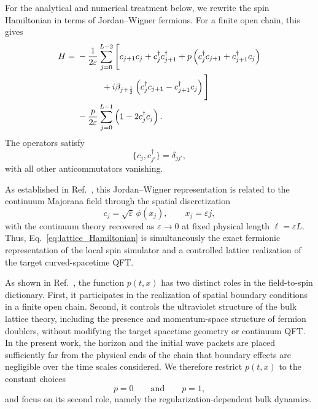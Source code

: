\documentclass[reprint,amsmath,amssymb,aps,prb,floatfix,showkeys,superscriptaddress]{revtex4-2}
\begin{document}
For the analytical and numerical treatment below, we rewrite the
spin Hamiltonian in terms of Jordan--Wigner fermions. For a finite
open chain, this gives
\begin{align}
  H
  ={}&
  -\frac{1}{2\varepsilon}
  \sum_{j=0}^{L-2}
  \Bigg[
    c_{j+1}c_j
    +
    c_j^\dagger c_{j+1}^\dagger
    +
    p\left(
      c_j^\dagger c_{j+1}
      +
      c_{j+1}^\dagger c_j
    \right)
  \nonumber\\
  &\hspace{10mm}
    +
    i\beta_{j+\frac12}
    \left(
      c_j^\dagger c_{j+1}
      -
      c_{j+1}^\dagger c_j
    \right)
  \Bigg]
  \nonumber\\
  &-
  \frac{p}{2\varepsilon}
  \sum_{j=0}^{L-1}
  \left(
    1-2c_j^\dagger c_j
  \right).
  \label{eq:lattice_Hamiltonian}
\end{align}
The operators satisfy
\begin{equation}
  \{c_j,c_{j'}^\dagger\}
  =
  \delta_{jj'},
  \label{eq:lattice_anticommutation}
\end{equation}
with all other anticommutators vanishing.

As established in Ref.~\cite{Kinoshita2025}, this Jordan--Wigner
representation is related to the continuum Majorana field through
the spatial discretization
\begin{equation}
  c_j
  =
  \sqrt{\varepsilon}\,
  \phi(x_j),
  \qquad
  x_j=\varepsilon j,
  \label{eq:continuum_identification}
\end{equation}
with the continuum theory recovered as
$\varepsilon\to0$ at fixed physical length
$\ell=\varepsilon L$. Thus,
Eq.~\eqref{eq:lattice_Hamiltonian} is simultaneously the exact
fermionic representation of the local spin simulator and a
controlled lattice realization of the target curved-spacetime QFT.

As shown in Ref.~\cite{KinoshitaBoundary2026}, the function
$p(t,x)$ has two distinct roles in the field-to-spin dictionary.
First, it participates in the realization of spatial boundary
conditions in a finite open chain. Second, it controls the
ultraviolet structure of the bulk lattice theory, including the
presence and momentum-space structure of fermion doublers, without
modifying the target spacetime geometry or continuum QFT. In the
present work, the horizon and the initial wave packets are placed
sufficiently far from the physical ends of the chain that boundary
effects are negligible over the time scales considered. We therefore
restrict $p(t,x)$ to the constant choices
\begin{equation}
  p=0
  \qquad\text{and}\qquad
  p=1,
  \label{eq:p_choices}
\end{equation}
and focus on its second role, namely the regularization-dependent
bulk dynamics.
\end{document}
